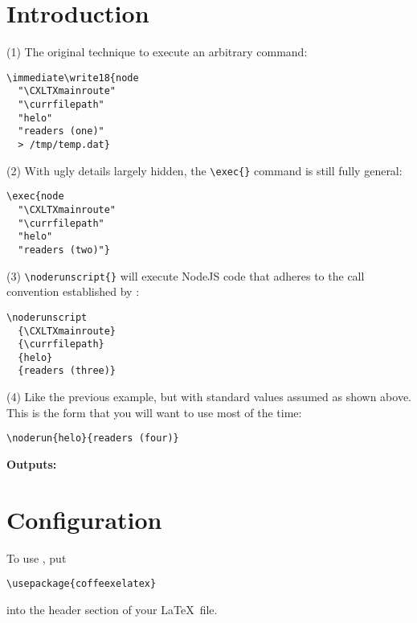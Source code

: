 

\clearpage%

\section{Introduction}\label{intro}

(1) The original technique to execute an arbitrary command:
\begin{verbatim}
\immediate\write18{node
  "\CXLTXmainroute"
  "\currfilepath"
  "helo"
  "readers (one)"
  > /tmp/temp.dat}
\end{verbatim}

(2) With ugly details largely hidden, the \verb#\exec{}# command is still fully general:
\begin{verbatim}
\exec{node
  "\CXLTXmainroute"
  "\currfilepath"
  "helo"
  "readers (two)"}
\end{verbatim}

(3) \verb#\noderunscript{}# will execute NodeJS code that adheres to the call convention established by
\CXLTX:
\begin{verbatim}
\noderunscript
  {\CXLTXmainroute}
  {\currfilepath}
  {helo}
  {readers (three)}
\end{verbatim}

(4) Like the previous example, but with standard values assumed as shown above. This is the form that you
will want to use most of the time:
\begin{verbatim}
\noderun{helo}{readers (four)}
\end{verbatim}


{\textbf{Outputs:}}

\immediate{}




\clearpage\section{Configuration}\label{config}

To use \CXLTX, put
\begin{verbatim}
\usepackage{coffeexelatex}
\end{verbatim}
into the header section of your \LaTeX\ file.

